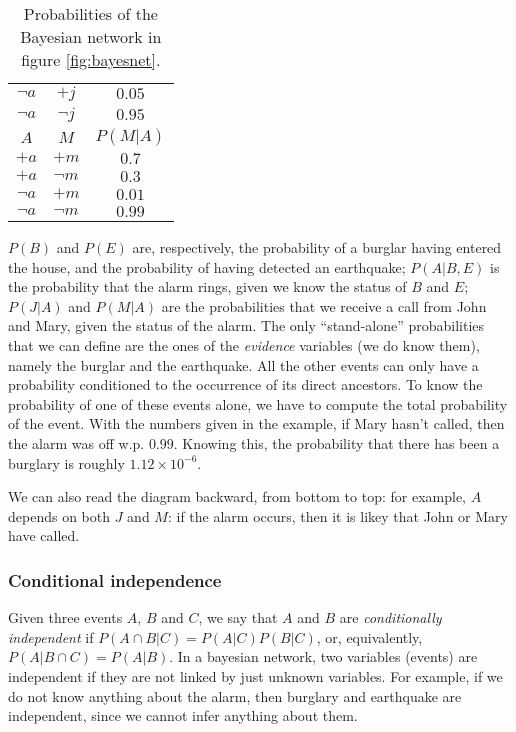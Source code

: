 \begin{table}[h]
\begin{minipage}{.35\linewidth}
\begin{tabular}{ccc}
          $\neg a$ & $+j$     & $0.05$ \\
          $\neg a$ & $\neg j$ & $0.95$ \\
          \bottomrule
          \toprule
          $A$ & $M$ & $P(M|A)$ \\
          \midrule
          $+a$     & $+m$     & $0.7$ \\
          $+a$     & $\neg m$ & $0.3$ \\
          $\neg a$ & $+m$     & $0.01$ \\
          $\neg a$ & $\neg m$ & $0.99$ \\
          \bottomrule
        \end{tabular}
    \end{minipage}%
    \caption{Probabilities of the Bayesian network in figure \ref{fig:bayesnet}.}
    \label{tab:probsbn}
\end{table}

$P(B)$ and $P(E)$ are, respectively, the probability of a burglar having entered the house, and the probability of having detected an earthquake; $P(A|B,E)$ is the probability that the alarm rings, given we know the status of $B$ and $E$; $P(J|A)$ and $P(M|A)$ are the probabilities that we receive a call from John and Mary, given the status of the alarm. The only ``stand-alone'' probabilities that we can define are the ones of the \textit{evidence} variables (we do know them), namely the burglar and the earthquake. All the other events can only have a probability conditioned to the occurrence of its direct ancestors. To know the probability of one of these events alone, we have to compute the total probability of the event.
With the numbers given in the example, if Mary hasn't called, then the alarm was off w.p. $0.99$. Knowing this, the probability that there has been a burglary is roughly $1.12 \times 10^{-6}$.

We can also read the diagram backward, from bottom to top: for example, $A$ depends on both $J$ and $M$: if the alarm occurs, then it is likey that John or Mary have called.

\subsubsection{Conditional independence}
Given three events $A$, $B$ and $C$, we say that $A$ and $B$ are \textit{conditionally independent} if $P(A \cap B | C) = P(A|C)P(B|C)$, or, equivalently, $P(A | B \cap C) = P(A|B)$. In a bayesian network, two variables (events) are independent if they are not linked by just unknown variables. For example, if we do not know anything about the alarm, then burglary and earthquake are independent, since we cannot infer anything about them.

